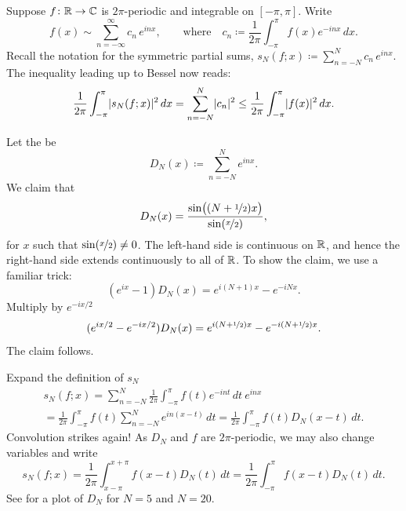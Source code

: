 Suppose $f \colon {\mathbb{R}} \to {\mathbb{C}}$ is $2\pi$-periodic and integrable
on $[-\pi,\pi]$.
Write
\begin{equation*}
f(x) \sim
\sum_{n=-\infty}^\infty c_n \,e^{inx} ,
\qquad \text{where} \quad
c_n \coloneqq 
\frac{1}{2\pi} \int_{-\pi}^\pi
f(x) e^{-inx} \, dx .
\end{equation*}
Recall the notation for the symmetric partial sums,
$s_N(f;x) \coloneqq 
\sum_{n=-N}^N c_n \,e^{inx}$.
The inequality leading up to Bessel now reads:
\begin{equation*}
\frac{1}{2\pi} \int_{-\pi}^\pi
\lvert {s_N(f;x)} \rvert^2 \, dx =
\sum_{n=-N}^N \lvert {c_n} \rvert^2
\leq
\frac{1}{2\pi} \int_{-\pi}^\pi
\lvert {f(x)} \rvert^2
\, dx .
\end{equation*}

Let the \emph{} be
\begin{equation*}
D_N(x) \coloneqq \sum_{n=-N}^N e^{inx} .
\end{equation*}
We claim that
\begin{equation*}
D_N(x) =
\frac{\sin\bigl( (N+\nicefrac{1}{2})x \bigr)}{\sin(\nicefrac{x}{2})} ,
\end{equation*}
for $x$ such that $\sin(\nicefrac{x}{2}) \not= 0$.  The left-hand
side is continuous on ${\mathbb{R}}$, and hence the right-hand side extends continuously to
all of ${\mathbb{R}}$.
To show the claim,
we use a familiar trick:
\begin{equation*}
(e^{ix}-1) D_N(x) = e^{i(N+1)x} - e^{-iNx} .
\end{equation*}
Multiply by $e^{-ix/2}$
\begin{equation*}
(e^{ix/2}-e^{-ix/2}) D_N(x) = e^{i(N+\nicefrac{1}{2})x} -
e^{-i(N+\nicefrac{1}{2})x} .
\avoidbreak
\end{equation*}
The claim follows.

Expand the definition of $s_N$
\begin{multline*}
s_N(f;x) = 
\sum_{n=-N}^N \frac{1}{2\pi} \int_{-\pi}^\pi f(t) e^{-int}  \,  dt ~ e^{inx}
\\
=
\frac{1}{2\pi} \int_{-\pi}^\pi f(t) \sum_{n=-N}^N e^{in(x-t)} \, dt
=
\frac{1}{2\pi} \int_{-\pi}^\pi f(t) D_N(x-t) \, dt .
\end{multline*}
Convolution strikes again!
As $D_N$ and $f$ are $2\pi$-periodic, we may also change variables and write 
\begin{equation*}
s_N(f;x) = 
\frac{1}{2\pi} \int_{x-\pi}^{x+\pi} f(x-t) D_N(t) \, dt
=
\frac{1}{2\pi} \int_{-\pi}^\pi f(x-t) D_N(t) \, dt .
\end{equation*}
See  for a plot of $D_N$ for $N=5$ and $N=20$.

